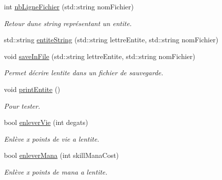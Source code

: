 \begin{DoxyCompactItemize}
int \hyperlink{classentite_a983d51dcdfaaddaf95096587ea33a3ec}{nb\+Ligne\+Fichier} (std\+::string nom\+Fichier)
\begin{DoxyCompactList}\small\item\em Retour d\textquotesingle{}une string représentant un entite. \end{DoxyCompactList}\item 
std\+::string \hyperlink{classentite_aef8675e5f8592e0cc56661d4d5827d1f}{entite\+String} (std\+::string lettre\+Entite, std\+::string nom\+Fichier)
\item 
void \hyperlink{classentite_a7bd09aa63160345500b6d6c4dca6cf52}{save\+In\+File} (std\+::string lettre\+Entite, std\+::string nom\+Fichier)
\begin{DoxyCompactList}\small\item\em Permet d\textquotesingle{}écrire l\textquotesingle{}entite dans un fichier de sauvegarde. \end{DoxyCompactList}\item 
void \hyperlink{classentite_abb1bd724598359ea2b7c3b05546d59d3}{print\+Entite} ()
\begin{DoxyCompactList}\small\item\em Pour tester. \end{DoxyCompactList}\item 
bool \hyperlink{classentite_a024cbcffabd07556d550f5941f2113d4}{enlever\+Vie} (int degats)
\begin{DoxyCompactList}\small\item\em Enlève x points de vie a l\textquotesingle{}entite. \end{DoxyCompactList}\item 
bool \hyperlink{classentite_a48c1c38c58bbfa074885ac45a2584772}{enlever\+Mana} (int skill\+Mana\+Cost)
\begin{DoxyCompactList}\small\item\em Enlève x points de mana a l\textquotesingle{}entite. \end{DoxyCompactList}\end{DoxyCompactItemize}
